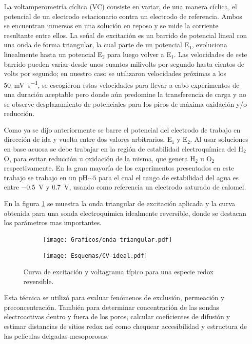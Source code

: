 	 		La voltamperometría cíclica (VC) consiste en variar, de una manera cíclica, el potencial de un electrodo estacionario contra un electrodo de referencia. Ambos se encuentran inmersos en una solución en reposo y se mide la corriente resultante entre ellos. La señal de excitación es un barrido de potencial lineal con una onda de forma triangular, la cual parte de un potencial E$_1$, evoluciona linealmente hasta un potencial E$_2$ para luego volver a E$_1$. Las velocidades de este barrido pueden variar desde unos cuantos milivolts por segundo hasta cientos de volts por segundo; en nuestro caso se utilizaron velocidades próximas a los \SI{50}{\milli\volt.\second^{-1}}, se escogieron estas velocidades para llevar a cabo experimentos de una duración aceptable pero donde aún predomine la transferencia de carga y no se observe desplazamiento de potenciales para los picos de máxima oxidación y/o reducción.\cite{nicholson1964,Gewirth2004}

	 		Como ya se dijo anteriormente se barre el potencial del electrodo de trabajo en dirección de ida y vuelta entre dos valores arbitrarios, E$_1$ y E$_2$. Al usar soluciones en base acuosa se debe trabajar en la región de estabilidad electroquímica del H$_2$O, para evitar reducción u oxidación de la misma, que genera H$_2$ u O$_2$ respectivamente. En la gran mayoría de los experimentos presentados en este trabajo se trabajo en un pH$\sim 5$ para el cual el rango de estabilidad del agua es entre \SI{-0.5}{\volt} y \SI{0.7}{\volt}, usando como referencia un electrodo saturado de calomel.\cite{wang2014} 

	 		En la figura \ref{fig:CV_ideal} se muestra la onda triangular de excitación aplicada y la curva obtenida para una sonda electroquímica idealmente reversible, donde se destacan los parámetros mas importantes.
	 			 \begin{figure}[ht]
			  		  \begin{subfigure}[t]{0.495\textwidth}
			  		  \texttt{[image: Graficos/onda-triangular.pdf]}
			  		  \end{subfigure}
			  		  \begin{subfigure}[t]{0.495\textwidth}
			  		  \texttt{[image: Esquemas/CV-ideal.pdf]}
			  		  \end{subfigure}
			  		  \caption[Voltamperometria ideal reversible]{Curva de excitación y voltagrama típico para una especie redox reversible.}
			  		  \label{fig:CV_ideal}
			  		  \end{figure}

	 		Esta técnica se utilizó para evaluar fenómenos de exclusión, permeación y preconcentración. También para determinar concentración de las sondas electroactivas dentro y fuera de los poros, calcular coeficientes de difusión y estimar distancias de sitios redox así como chequear accesibilidad y estructura de las películas delgadas mesoporosas.


